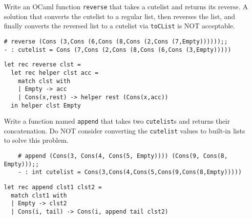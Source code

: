 \documentclass[addpoints]{exam}
\begin{document}
\begin{questions}
  \question
  Write an OCaml function \texttt{reverse} that takes a cutelist and 
  returns its reverse.
  A solution that converts the cutelist to a regular list,
  then reverses the list, and finally converts the reversed
  list to a cutelist via \texttt{toCList}
  is NOT acceptable.
  \begin{verbatim}
# reverse (Cons (3,Cons (6,Cons (8,Cons (2,Cons (7,Empty))))));;
- : cutelist = Cons (7,Cons (2,Cons (8,Cons (6,Cons (3,Empty)))))
  \end{verbatim}

  \begin{solutionbox}{4cm}
    \begin{verbatim}
let rec reverse clst =
  let rec helper clst acc =
    match clst with
    | Empty -> acc
    | Cons(x,rest) -> helper rest (Cons(x,acc))
  in helper clst Empty
    \end{verbatim}
  \end{solutionbox}

  
  \question
  Write a function named \texttt{append} that takes
  two \texttt{cutelist}s and returns their concatenation.
  Do NOT consider converting the \texttt{cutelist} values to
  built-in lists to solve this problem.
  
  \begin{verbatim}
    # append (Cons(3, Cons(4, Cons(5, Empty)))) (Cons(9, Cons(8, Empty)));;
    - : int cutelist = Cons(3,Cons(4,Cons(5,Cons(9,Cons(8,Empty)))))
  \end{verbatim}

  \begin{solutionbox}{3cm}
    \begin{verbatim}
let rec append clst1 clst2 =
  match clst1 with
  | Empty -> clst2
  | Cons(i, tail) -> Cons(i, append tail clst2)
    \end{verbatim}
  \end{solutionbox}

    
\end{questions}
\end{document}
